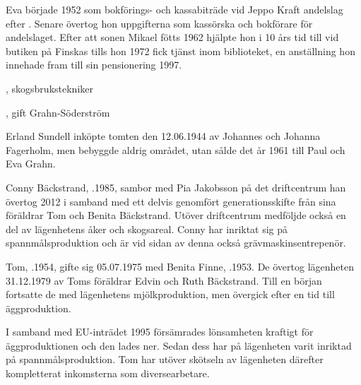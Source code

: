 Eva började 1952 som bokförings- och kassabiträde vid Jeppo Kraft andelslag efter . Senare övertog hon uppgifterna som kassörska och bokförare för andelslaget. Efter att sonen Mikael fötts 1962 hjälpte hon i 10 års tid till vid butiken på Finskas tills hon 1972 fick tjänst inom biblioteket, en anställning hon innehade fram till sin pensionering 1997.
\begin{jhchildren}
  \item {}
  \item {}, skogsbrukstekniker
  \item {}, gift Grahn-Söderström
\end{jhchildren}


%
Erland Sundell inköpte tomten den 12.06.1944 av Johannes och Johanna Fagerholm, men bebyggde aldrig området, utan sålde det år 1961 till Paul och Eva Grahn.


%



%
Conny Bäckstrand, .1985, sambor med Pia Jakobsson på det driftcentrum han övertog 2012 i samband med ett delvis genomfört generationsskifte från sina föräldrar Tom och Benita Bäckstrand. Utöver driftcentrum medföljde också en del av lägenhetens åker och skogsareal. Conny har inriktat sig på spannmålsproduktion och är vid sidan av denna också grävmaskinsentrepenör.


%
Tom, .1954, gifte sig 05.07.1975 med Benita Finne, .1953. De övertog lägenheten 31.12.1979 av Toms föräldrar Edvin och Ruth Bäckstrand. Till en början fortsatte de med lägenhetens mjölkproduktion, men övergick efter en tid till äggproduktion.

I samband med EU-inträdet 1995 försämrades lönsamheten kraftigt för äggproduktionen och den lades ner. Sedan dess har på lägenheten varit inriktad på spannmålsproduktion. Tom har utöver skötseln av lägenheten därefter kompletterat inkomsterna som diversearbetare.

